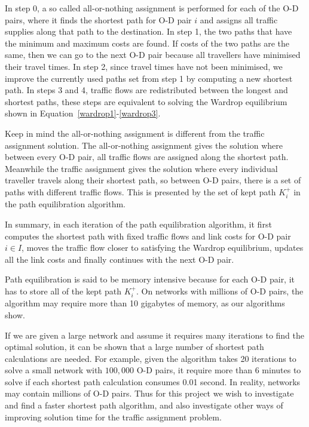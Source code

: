 In step 0, a so called all-or-nothing assignment is performed for each of the O-D pairs,
where it finds the shortest path for O-D pair $i$ and assigns all traffic supplies along that path to the destination.
In step 1, the two paths that have the minimum and maximum costs are found.
If costs of the two paths are the same, then we can go to the next O-D pair because all travellers have minimised their travel times.
In step 2, since travel times have not been minimised, we improve the currently used paths set from step 1 by computing a new shortest path.
In steps 3 and 4, traffic flows are redistributed between the longest and shortest paths, these steps are equivalent to solving the Wardrop equilibrium shown in Equation~\eqref{wardrop1}-\eqref{wardrop3}.

Keep in mind the all-or-nothing assignment is different from the traffic assignment solution.
The all-or-nothing assignment gives the solution where between every O-D pair,
all traffic flows are assigned along the shortest path.
Meanwhile the traffic assignment gives the solution where every individual traveller travels along their shortest path,
so between O-D pairs, there is a set of paths with different traffic flows.
This is presented by the set of kept path $K_i^+$ in the path equilibration algorithm.

In summary, in each iteration of the path equilibration algorithm,
it first computes the shortest path with fixed traffic flows and link costs for O-D pair $i \in I$, moves the traffic flow closer to satisfying the Wardrop equilibrium,
updates all the link costs and finally continues with the next O-D pair.

Path equilibration is said to be memory intensive because for each O-D pair, it has to store all of the kept path $K_i^+$.
On networks with millions of O-D pairs, the algorithm may require more than 10 gigabytes of memory, as our algorithms show.

If we are given a large network and assume it requires many iterations to find the optimal solution,
it can be shown that a large number of shortest path calculations are needed.
For example, 
given the algorithm takes 20 iterations to solve a small network with $100,000$ O-D pairs,
it require more than 6 minutes to solve if
each shortest path calculation consumes 0.01 second.
In reality,
networks may contain millions of O-D pairs.
Thus for this project we wish to
investigate and find a faster shortest path algorithm,
and also investigate other ways of improving solution time for the traffic assignment problem.

